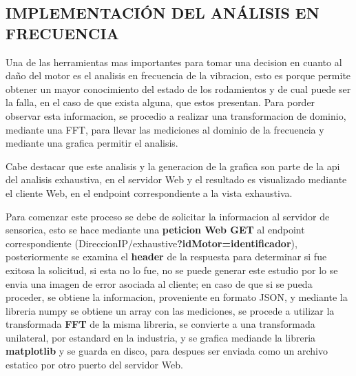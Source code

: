
\subsection{IMPLEMENTACIÓN DEL ANÁLISIS EN FRECUENCIA}

Una de las herramientas mas importantes para tomar una decision en cuanto
al daño del motor es el analisis en frecuencia de la vibracion, esto es porque
permite obtener un mayor conocimiento del estado de los rodamientos y de cual
puede ser la falla, en el caso de que exista alguna, que estos presentan. Para
porder observar esta informacion, se procedio a realizar una transformacion de
dominio, mediante una FFT, para llevar las mediciones al dominio de la frecuencia
y mediante una grafica permitir el analisis.

Cabe destacar que este analisis y la generacion de la grafica son parte de la
api del analisis exhaustiva, en el servidor Web y el resultado es visualizado
mediante el cliente Web, en el endpoint correspondiente a la vista exhaustiva.

Para comenzar este proceso se debe de solicitar la informacion al servidor de
sensorica, esto se hace mediante una \textbf{peticion Web GET} al endpoint
correspondiente (DireccionIP/exhaustive\textbf{?idMotor=identificador}), posteriormente
se examina el \textbf{header} de la respuesta para determinar si fue exitosa
la solicitud, si esta no lo fue, no se puede generar este estudio por lo se envia una
imagen de error asociada al cliente; en caso de que si se pueda proceder, se
obtiene la informacion, proveniente en formato JSON, y mediante la libreria
numpy se obtiene un array con las mediciones, se procede a utilizar la transformada
\textbf{FFT} de la misma libreria, se convierte a una transformada unilateral,
por estandard en la industria, y se grafica mediande la libreria \textbf{matplotlib}
y se guarda en disco, para despues ser enviada como un archivo estatico por otro
puerto del servidor Web.
